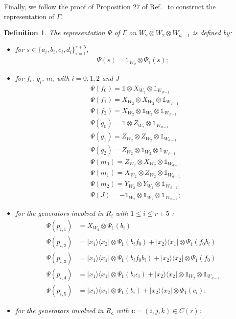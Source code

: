 \documentclass[11pt,letterpaper]{article}
\newcommand{\ketbra}[2]{|#1\rangle\langle#2|}
\newcommand{\x}{\otimes}
\newcommand{\1}{\mathbb{1}}
\newcommand{\bc}{\pmb{c}}
\newtheorem{definition}[theorem]{Definition}
\theoremstyle{definition}
\begin{document}
Finally, we follow the proof of Proposition $27$ of Ref.~\cite{slofstra2017} to construct the 
representation of $\Gamma$.
\begin{definition}
\label{def:rep_gamma}
The representation $\Psi$ of $\Gamma$ on $W_2 \x W_2 \x W_{d-1}$ is defined by:
\begin{itemize}
\item for $s \in \{a_i, b_i, c_i, d_i\}_{i=1}^{r+5}$,
\begin{align*}
	\Psi(s) = \1_{W_2} \x \Psi_1(s);
\end{align*}
\item for $f_i$, $g_i$, $m_i$ with $i = 0,1,2$ and $J$
\begin{align*}
    &\Psi(f_0) = \1 \x X_{W_2} \x \1_{W_{d-1}} \\
	&\Psi(f_1) = X_{W_2} \x X_{W_2} \x \1_{W_{d-1}} \\
	&\Psi(f_2) = X_{W_2} \x \1_{W_2} \x \1_{W_{d-1}} \\
	&\Psi(g_0) = \1 \x Z_{W_2} \x \1_{W_{d-1}} \\
	&\Psi(g_1) = Z_{W_2} \x Z_{W_2} \x \1_{W_{d-1}} \\
	&\Psi(g_2) = Z_{W_2} \x \1_{W_2} \x \1_{W_{d-1}} \\
	& \Psi(m_0) = Z_{W_2} \x X_{W_2} \x \1_{W_{d-1}}\\
	& \Psi(m_1) = X_{W_2} \x Z_{W_2} \x \1_{W_{d-1}}\\
	& \Psi(m_2) = Y_{W_2} \x Y_{W_2} \x \1_{W_{d-1}}\\
	& \Psi(J) = - \1_{W_2} \x \1_{W_2} \x \1_{W_{d-1}};
\end{align*}
\item for the generators involved in $R_i$
with $1 \leq i \leq r+5$ :
\begin{align*}
	\Psi(p_{i,1}) &= X_{W_2} \x \Psi_1(b_i) \\
	\Psi(p_{i,2}) &= \ketbra{x_1}{x_2} \x \Psi_1(b_if_0) + \ketbra{x_2}{x_1} \x \Psi_1(f_0b_i)\\
	\Psi(p_{i,3}) &= \ketbra{x_1}{x_1} \x \Psi_1(b_if_0b_i) + \ketbra{x_2}{x_2} \x \Psi_1(f_0) \\
	\Psi(p_{i,4}) &= \ketbra{x_1}{x_1} \x \Psi_1(b_ic_i) + \ketbra{x_2}{x_2} \x \1_{W_2} \x \1_{W_{d-1}}\\
    \Psi(p_{i,5}) &= \ketbra{x_1}{x_1} \x \Psi_1(b_i) + \ketbra{x_2}{x_2} \x \Psi_1(c_i);
\end{align*}
\item for the generators involved in $R_{\bc}$ with $\bc = (i,j,k) \in C(r)$:
\begin{align*}

\end{align*}
\end{itemize}
\end{definition}
\end{document}
